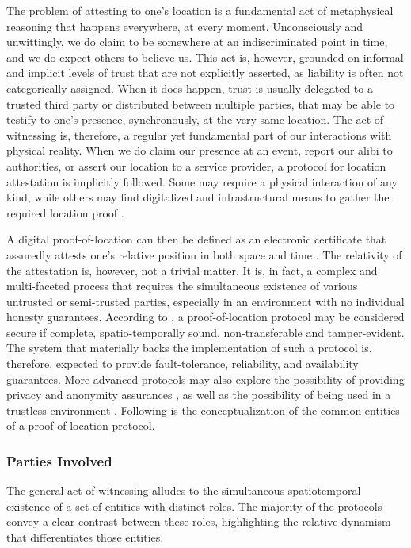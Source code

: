 The problem of attesting to one's location is a fundamental act of metaphysical reasoning that happens everywhere, at every moment. Unconsciously and unwittingly, we do claim to be somewhere at an indiscriminated point in time, and we do expect others to believe us. This act is, however, grounded on informal and implicit levels of trust that are not explicitly asserted, as liability is often not categorically assigned. When it does happen, trust is usually delegated to a trusted third party or distributed between multiple parties, that may be able to testify to one's presence, synchronously, at the very same location. The act of witnessing is, therefore, a regular yet fundamental part of our interactions with physical reality. When we do claim our presence at an event, report our alibi to authorities, or assert our location to a service provider, a protocol for location attestation is implicitly followed. Some may require a physical interaction of any kind, while others may find digitalized and infrastructural means to gather the required location proof \cite{luo2010veriplace}.

A digital proof-of-location can then be defined as an electronic certificate that assuredly attests one's relative position in both space and time \cite{amoretti2018blockchain}. The relativity of the attestation is, however, not a trivial matter. It is, in fact, a complex and multi-faceted process that requires the simultaneous existence of various untrusted or semi-trusted parties, especially in an environment with no individual honesty guarantees. According to \cite{nasrulin2018robust}, a proof-of-location protocol may be considered secure if complete, spatio-temporally sound, non-transferable and tamper-evident. The system that materially backs the implementation of such a protocol is, therefore, expected to provide fault-tolerance, reliability, and availability guarantees. More advanced protocols may also explore the possibility of providing privacy and anonymity assurances \cite{li2020privacy}, as well as the possibility of being used in a trustless environment \cite{amoretti2018blockchain}. Following is the conceptualization of the common entities of a proof-of-location protocol.

\subsubsection{Parties Involved}

The general act of witnessing alludes to the simultaneous spatiotemporal existence of a set of entities with distinct roles. The majority of the protocols convey a clear contrast between these roles, highlighting the relative dynamism that differentiates those entities. 

